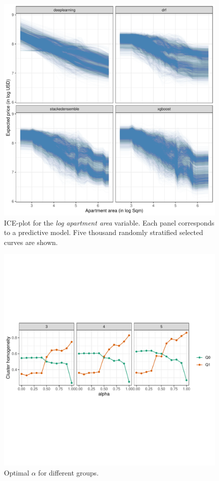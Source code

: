 \documentclass[smallextended,natbib]{svjour3}\usepackage[]{graphicx}\usepackage[]{xcolor}
\newcommand{\1}[1]{\mathbbm{1}_{#1}}
\begin{document}
\begin{figure}[hbpt]
    \centering
    \includegraphics[scale=0.6]{figures/fig-ice-sup-dec.pdf}
    \caption{ICE-plot for the \textit{log apartment area} variable. Each panel corresponds to a predictive model. Five thousand randomly stratified selected curves are shown.}
    \label{fig-icesup}
\end{figure}

\begin{figure}[hbpt] 
    \centering
    \includegraphics[trim=0 4cm 0 4cm, clip, scale=.6]{figures/fig-alphaoptimo.pdf}
    \caption{Optimal $\alpha$ for different groups.}
    \label{alpfaoptimo}
\end{figure}
\end{document}
